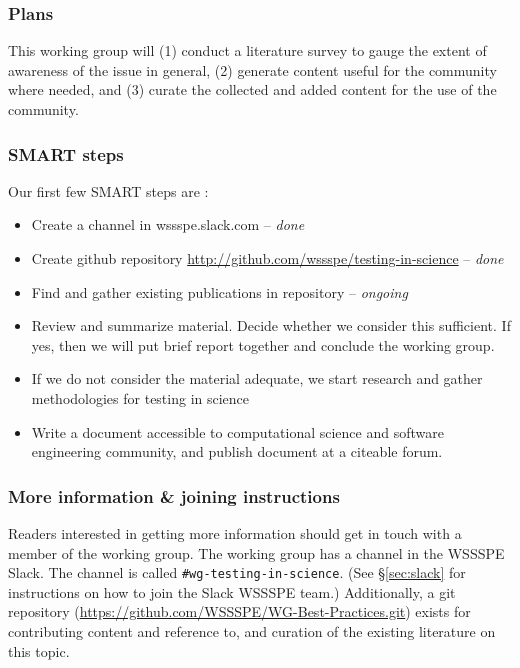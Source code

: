 \subsubsection{Plans}

This working group will (1) conduct a literature survey to gauge the extent
of awareness of the issue in general, (2) generate content useful for
the community where needed, and (3) curate the collected and added
content for the use of the community.


\subsubsection{SMART steps}

Our first few SMART steps are :
\begin{itemize}
\item Create a channel in wssspe.slack.com -- {\em done}
\item Create github repository
  {\url{http://github.com/wssspe/testing-in-science}} -- {\em done}
\item Find and gather existing publications in repository -- {\em ongoing}
\item Review and summarize material. Decide whether we consider this
  sufficient. If yes, then we will put brief report together and
  conclude the working group.
\item If we do not consider the material adequate, we start research
  and gather methodologies for testing in science
\item Write a document accessible to computational science and
  software engineering community, and publish document at a citeable forum.
\end{itemize}

\subsubsection{More information \& joining instructions}

Readers interested in getting more information should get in touch
with a member of the working group. The working group
has a channel in the WSSSPE Slack. The channel is called
\texttt{\#wg-testing-in-science}.
(See \S\ref{sec:slack} for instructions on how to join the Slack WSSSPE team.)
Additionally, a git
repository (\url{https://github.com/WSSSPE/WG-Best-Practices.git}) exists for contributing content and reference to, and
curation of the existing literature on this topic.
